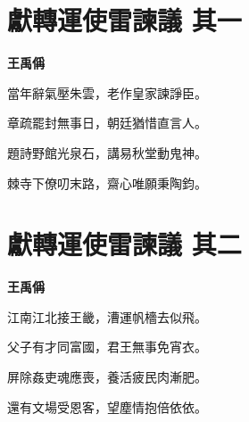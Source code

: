 \documentclass[12pt,a4paper]{ctexbook}
\begin{document}
\section{獻轉運使雷諫議  其一}
\textbf{王禹偁}\par\vspace{0.5em}
當年辭氣壓朱雲，老作皇家諫諍臣。\par
章疏罷封無事日，朝廷猶惜直言人。\par
題詩野館光泉石，講易秋堂動鬼神。\par
棘寺下僚叨末路，齋心唯願秉陶鈞。\par

\section{獻轉運使雷諫議  其二}
\textbf{王禹偁}\par\vspace{0.5em}
江南江北接王畿，漕運帆檣去似飛。\par
父子有才同富國，君王無事免宵衣。\par
屏除姦吏魂應喪，養活疲民肉漸肥。\par
還有文場受恩客，望塵情抱倍依依。\par
\end{document}
